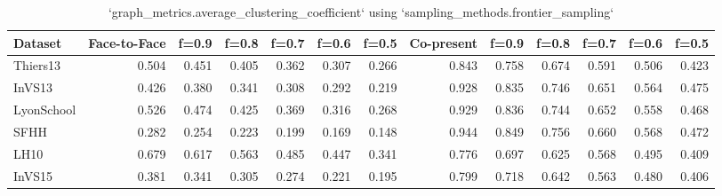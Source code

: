\begin{table}[ht]
\begin{tabular}{lrrrrrrrrrrrr}
\hline
 Dataset    &   Face-to-Face &   f=0.9 &   f=0.8 &   f=0.7 &   f=0.6 &   f=0.5 &   Co-present &   f=0.9 &   f=0.8 &   f=0.7 &   f=0.6 &   f=0.5 \\
\hline
 Thiers13   &          0.504 &   0.451 &   0.405 &   0.362 &   0.307 &   0.266 &        0.843 &   0.758 &   0.674 &   0.591 &   0.506 &   0.423 \\
 InVS13     &          0.426 &   0.380 &   0.341 &   0.308 &   0.292 &   0.219 &        0.928 &   0.835 &   0.746 &   0.651 &   0.564 &   0.475 \\
 LyonSchool &          0.526 &   0.474 &   0.425 &   0.369 &   0.316 &   0.268 &        0.929 &   0.836 &   0.744 &   0.652 &   0.558 &   0.468 \\
 SFHH       &          0.282 &   0.254 &   0.223 &   0.199 &   0.169 &   0.148 &        0.944 &   0.849 &   0.756 &   0.660 &   0.568 &   0.472 \\
 LH10       &          0.679 &   0.617 &   0.563 &   0.485 &   0.447 &   0.341 &        0.776 &   0.697 &   0.625 &   0.568 &   0.495 &   0.409 \\
 InVS15     &          0.381 &   0.341 &   0.305 &   0.274 &   0.221 &   0.195 &        0.799 &   0.718 &   0.642 &   0.563 &   0.480 &   0.406 \\
\hline
\end{tabular}
\caption{`graph_metrics.average_clustering_coefficient` using `sampling_methods.frontier_sampling`}
\end{table}